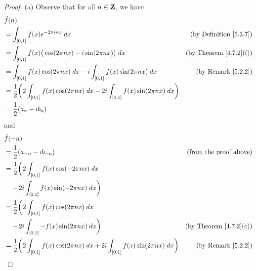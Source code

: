\begin{proof}{(a)}
    Observe that for all \(n \in \mathbf{Z}\), we have
    \begin{align*}
         & \hat{f}(n)                                                                                                                                              \\
         & = \int_{[0, 1]} f(x) e^{- 2 \pi i n x} \; dx                                                                       & \text{(by Definition \ref{5.3.7})} \\
         & = \int_{[0, 1]} f(x) \big(\cos(2 \pi n x) - i \sin(2 \pi n x)\big) \; dx                                           & \text{(by Theorem \ref{4.7.2}(f))} \\
         & = \int_{[0, 1]} f(x) \cos(2 \pi n x) \; dx - i \int_{[0, 1]} f(x) \sin(2 \pi n x) \; dx                            & \text{(by Remark \ref{5.2.2})}     \\
         & = \frac{1}{2} \bigg(2 \int_{[0, 1]} f(x) \cos(2 \pi n x) \; dx - 2i \int_{[0, 1]} f(x) \sin(2 \pi n x) \; dx\bigg)                                      \\
         & = \frac{1}{2} (a_n - i b_n)
    \end{align*}
    and
    \begin{align*}
         & \hat{f}(-n)                                                                                                                                             \\
         & = \frac{1}{2} (a_{-n} - i b_{-n})                                                                                  & \text{(from the proof above)}      \\
         & = \frac{1}{2} \bigg(2 \int_{[0, 1]} f(x) \cos(- 2 \pi n x) \; dx                                                                                        \\
         & \quad - 2i \int_{[0, 1]} f(x) \sin(- 2 \pi n x) \; dx\bigg)                                                                                             \\
         & = \frac{1}{2} \bigg(2 \int_{[0, 1]} f(x) \cos(2 \pi n x) \; dx                                                                                          \\
         & \quad - 2i \int_{[0, 1]} -f(x) \sin(2 \pi n x) \; dx\bigg)                                                         & \text{(by Theorem \ref{4.7.2}(c))} \\
         & = \frac{1}{2} \bigg(2 \int_{[0, 1]} f(x) \cos(2 \pi n x) \; dx + 2i \int_{[0, 1]} f(x) \sin(2 \pi n x) \; dx\bigg) & \text{(by Remark \ref{5.2.2})}     \\

\end{align*}
\end{proof}
